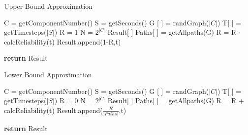 \documentclass[a4paper,12pt]{article}
\begin{document}
\begin{algorithm}
	\caption{Upper Bound Approximation} 
	\begin{algorithmic}[1]
		\State C = getComponentNumber()
		\State S = getSeconds()
		\State G [ ] = randGraph($|C|$)
		\State T[ ] = getTimesteps($|S|$)
		\State R = 1
		\State N = $2^{|C|}$
		\State Result[ ]
		\State Paths[ ] = getAllpaths(G)
				\State R = R $\cdot$ calcReliability(t) 
			\EndFor
		\State Result.append(1-R,t)
		\EndFor
		
		\State \textbf{return} Result
	\end{algorithmic} 
\end{algorithm}


\begin{algorithm}
	\caption{Lower Bound Approximation} 
	\begin{algorithmic}[1]
		\State C = getComponentNumber()
		\State S = getSeconds()
		\State G [ ] = randGraph($|C|$)
		\State T[ ] = getTimesteps($|S|$)
		\State R = 0
		\State N = $2^{|C|}$
		\State Result[ ]
		\State Paths[ ] = getAllpaths(G)
				\State R = R + calcReliability(t) 
			\EndFor
		\State Result.append($\frac{R}{|Paths|}$,t)
		\EndFor
		
		\State \textbf{return} Result
	\end{algorithmic} 
\end{algorithm}
\fi
\end{document}
